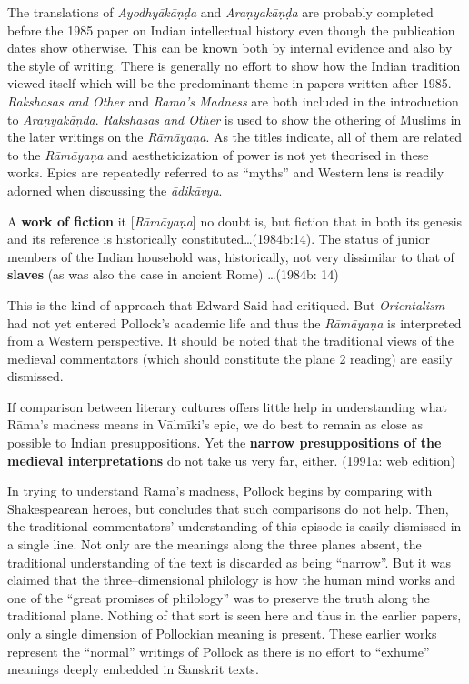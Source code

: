 The translations of \textit{Ayodhyākāṇḍa} and \textit{Araṇyakāṇḍa }are probably completed before the 1985 paper on Indian intellectual history even though the publication dates show otherwise. This can be known both by internal evidence and also by the style of writing. There is generally no effort to show how the Indian tradition viewed itself which will be the predominant theme in papers written after 1985. \textit{Rakshasas and Other} and \textit{Rama’s Madness} are both included in the introduction to \textit{Araṇyakāṇḍa}. \textit{Rakshasas and Other} is used to show the othering of Muslims in the later writings on the \textit{Rāmāyaṇa}. As the titles indicate, all of them are related to the \textit{Rāmāyaṇa} and aestheticization of power is not yet theorised in these works. Epics are repeatedly referred to as “myths” and Western lens is readily adorned when discussing the \textit{ādikāvya}.

\begin{myquote}
A \textbf{work of fiction} it [\textit{Rāmāyaṇa}] no doubt is, but fiction that in both its genesis and its reference is historically constituted…(1984b:14). The status of junior members of the Indian household was, historically, not very dissimilar to that of \textbf{slaves} (as was also the case in ancient Rome) …(1984b: 14)
\end{myquote}

This is the kind of approach that Edward Said had critiqued. But \textit{Orientalism }had not yet entered Pollock’s academic life and thus the \textit{Rāmāyaṇa }is interpreted from a Western perspective. It should be noted that the traditional views of the medieval commentators (which should constitute the plane 2 reading) are easily dismissed.

\begin{myquote}
If comparison between literary cultures offers little help in understanding what Rāma’s madness means in Vālmīki’s epic, we do best to remain as close as possible to Indian presuppositions. Yet the \textbf{narrow presuppositions of the medieval interpretations }do not take us very far, either. (1991a: web edition)
\end{myquote}

In trying to understand Rāma’s madness, Pollock begins by comparing with Shakespearean heroes, but concludes that such comparisons do not help. Then, the traditional commentators' understanding of this episode is easily dismissed in a single line. Not only are the meanings along the three planes absent, the traditional understanding of the text is discarded as being “narrow”. But it was claimed that the three–dimensional philology is how the human mind works and one of the “great promises of philology” was to preserve the truth along the traditional plane. Nothing of that sort is seen here and thus in the earlier papers, only a single dimension of Pollockian meaning is present. These earlier works represent the “normal” writings of Pollock as there is no effort to “exhume” meanings deeply embedded in Sanskrit texts.


